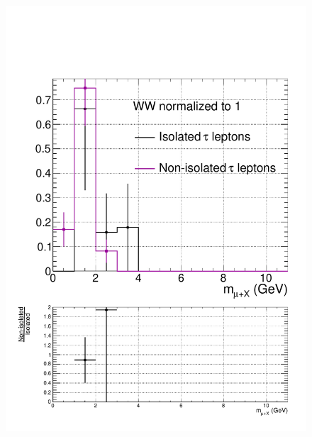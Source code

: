 \begin{figure}[hbtp]
\begin{center}
    \includegraphics[width=0.6\cmsFigWidth]{figures/isoVsNonIsoTaus_WW_highMT_v87}

\end{center}
\end{figure}
